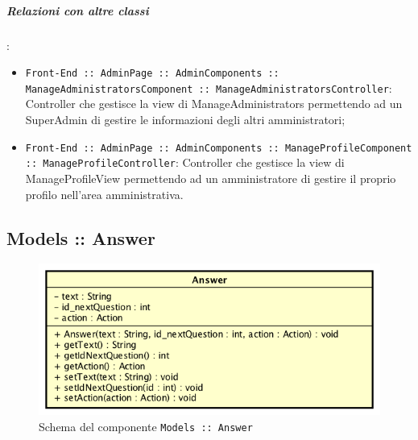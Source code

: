 \documentclass[../ManualeSviluppatore_v2.0.0.tex]{subfiles}
\begin{document}
		\subparagraph{Relazioni con altre classi}:
		      \begin{itemize}
		      	\item \texttt{Front-End :: AdminPage :: AdminComponents :: ManageAdministratorsComponent :: ManageAdministratorsController}: Controller che gestisce la view di ManageAdministrators permettendo ad un SuperAdmin di gestire le informazioni degli altri amministratori;
		      	\item \texttt{Front-End :: AdminPage :: AdminComponents :: ManageProfileComponent :: ManageProfileController}: Controller che gestisce la view di ManageProfileView permettendo ad un amministratore di gestire il proprio profilo nell'area amministrativa.
		      \end{itemize}

	\newpage
	\subsection{Models :: Answer}
	\begin{figure}[!h]
		\centering
		\includegraphics[scale=0.6]{Architettura/Front-End/Models/Answer.png}
		\caption{Schema del componente \texttt{Models :: Answer}}
	\end{figure}
\end{document}
